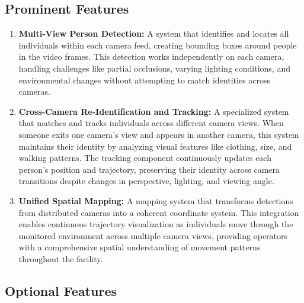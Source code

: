 \subsection{Prominent Features}
\label{subsection:main-features}

\begin{enumerate}[leftmargin=80pt]
    \item \textbf{Multi-View Person Detection:} A system that identifies and locates all individuals within each camera feed, creating bounding boxes around people in the video frames. This detection works independently on each camera, handling challenges like partial occlusions, varying lighting conditions, and environmental changes without attempting to match identities across cameras.

    \item \textbf{Cross-Camera Re-Identification and Tracking:} A specialized system that matches and tracks individuals across different camera views. When someone exits one camera's view and appears in another camera, this system maintains their identity by analyzing visual features like clothing, size, and walking patterns. The tracking component continuously updates each person's position and trajectory, preserving their identity across camera transitions despite changes in perspective, lighting, and viewing angle.

    \item \textbf{Unified Spatial Mapping:} A mapping system that transforms detections from distributed cameras into a coherent coordinate system. This integration enables continuous trajectory visualization as individuals move through the monitored environment across multiple camera views, providing operators with a comprehensive spatial understanding of movement patterns throughout the facility.
\end{enumerate}

\subsection{Optional Features}
\label{subsection:optional-features}

